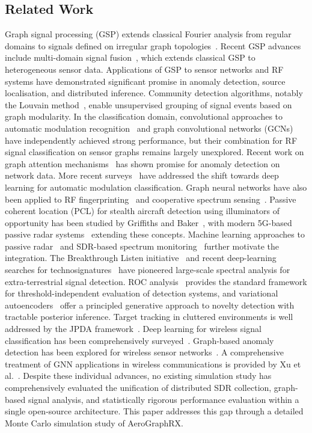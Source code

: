 \documentclass[sensors,article,submit,pdftex]{mdpi}
\begin{document}
\subsection{Related Work}
Graph signal processing (GSP) extends classical Fourier analysis from regular domains to signals defined on irregular graph topologies~\cite{shuman2013,sandryhaila2013}. Recent GSP advances include multi-domain signal fusion~\cite{hou2023}, which extends classical GSP to heterogeneous sensor data. Applications of GSP to sensor networks and RF systems have demonstrated significant promise in anomaly detection, source localisation, and distributed inference. Community detection algorithms, notably the Louvain method~\cite{blondel2008}, enable unsupervised grouping of signal events based on graph modularity. In the classification domain, convolutional approaches to automatic modulation recognition~\cite{oshea2016,oshea2018} and graph convolutional networks (GCNs)~\cite{kipf2017} have independently achieved strong performance, but their combination for RF signal classification on sensor graphs remains largely unexplored. Recent work on graph attention mechanisms~\cite{zhao2024} has shown promise for anomaly detection on network data. More recent surveys~\cite{chen2023} have addressed the shift towards deep learning for automatic modulation classification. Graph neural networks have also been applied to RF fingerprinting~\cite{gao2024} and cooperative spectrum sensing~\cite{wang2024spectrum}. Passive coherent location (PCL) for stealth aircraft detection using illuminators of opportunity has been studied by Griffiths and Baker~\cite{griffiths2017}, with modern 5G-based passive radar systems~\cite{maksymiuk2024} extending these concepts. Machine learning approaches to passive radar~\cite{liu2024passive} and SDR-based spectrum monitoring~\cite{luo2023sdr} further motivate the integration. The Breakthrough Listen initiative~\cite{sheikh2021,sheikh2018,price2018} and recent deep-learning searches for technosignatures~\cite{nature2023} have pioneered large-scale spectral analysis for extra-terrestrial signal detection. ROC analysis~\cite{fawcett2006} provides the standard framework for threshold-independent evaluation of detection systems, and variational autoencoders~\cite{kingma2014,li2025} offer a principled generative approach to novelty detection with tractable posterior inference. Target tracking in cluttered environments is well addressed by the JPDA framework~\cite{barshalom2011}. Deep learning for wireless signal classification has been comprehensively surveyed~\cite{rajendran2018,mao2018}. Graph-based anomaly detection has been explored for wireless sensor networks~\cite{zhang2023anomaly}. A comprehensive treatment of GNN applications in wireless communications is provided by Xu et al.~\cite{xu2025gnn}. Despite these individual advances, no existing simulation study has comprehensively evaluated the unification of distributed SDR collection, graph-based signal analysis, and statistically rigorous performance evaluation within a single open-source architecture. This paper addresses this gap through a detailed Monte Carlo simulation study of AeroGraphRX.
\end{document}
